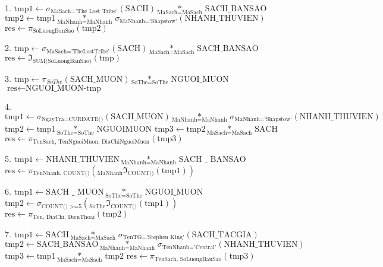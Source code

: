 \documentclass{article}
\begin{document}
1.
$\text{tmp1}\leftarrow {{\sigma }_{\text{MaSach='The Lost Tribe'}}}\left( \text{SACH} \right)\underset{\text{MaSach}=\text{MaSach}}{\mathop{*}}\,\text{SACH_BANSAO}$
$\text{tmp2}\leftarrow \text{tmp1}\underset{\text{MaNhanh}=\text{MaNhanh}}{\mathop{*}}\,{{\sigma }_{\text{MaNhanh='Shapstow'}}}\left( \text{NHANH_THUVIEN} \right)$
$\text{res}\leftarrow {{\pi }_{\text{SoLuongBanSao}}}\left( \text{tmp2} \right)$

2.
$\text{tmp}\leftarrow {{\sigma }_{\text{MaSach='TheLostTribe'}}}\left( \text{SACH} \right)\underset{\text{MaSach}=\text{MaSach}}{\mathop{*}}\,\text{SACH_BANSAO}$
$\text{res}\leftarrow {{\Im }_{\text{SUM(SoLuongBanSao)}}}\left( \text{tmp} \right)$

3.
$\text{tmp}\leftarrow {{\pi }_{SoThe}}\left( \text{SACH_MUON} \right)\underset{\text{SoThe}=\text{SoThe}}{\mathop{*}}\,\text{NGUOI_MUON}$
$\text{res}\leftarrow \text{NGUOI_MUON-tmp}$

4.
$\text{tmp1}\leftarrow {{\sigma }_{\text{NgayTra=CURDATE()}}}\left( \text{SACH_MUON} \right)\underset{\text{MaNhanh}=\text{MaNhanh}}{\mathop{*}}\,{{\sigma }_{\text{MaNhanh='Shapstow'}}}\left( \text{NHANH_THUVIEN} \right)$
$\text{tmp2}\leftarrow \text{tmp1}\underset{\text{SoThe}=\text{SoThe}}{\mathop{*}}\,\text{NGUOIMUON}$
$\text{tmp3}\leftarrow \text{tmp2}\underset{\text{MaSach}=\text{MaSach}}{\mathop{*}}\,\text{SACH}$
$\text{res}\leftarrow {{\pi }_{\text{TenSach, TenNguoiMuon, DiaChiNguoiMuon}}}\left( \text{tmp3} \right)$

5.
$\text{tmp1}\leftarrow \text{NHANH_THUVIEN}\underset{\text{MaNhanh}=\text{MaNhanh}}{\mathop{*}}\,\text{SACH _ BANSAO}$
$\text{res}\leftarrow {{\pi }_{\text{TenNhanh, COUNT()}}}\left( {}_{\text{MaNhanh}}{{\Im }_{\text{COUNT()}}}\left( \text{tmp1} \right) \right)$

6.
$\text{tmp1}\leftarrow \text{SACH _ MUON}\underset{\text{SoThe}=\text{SoThe}}{\mathop{*}}\,\text{NGUOI_MUON}$
$\text{tmp2}\leftarrow {{\sigma }_{\text{COUNT() >=5}}}\left( {}_{\text{SoThe}}{{\Im }_{\text{COUNT()}}}\left( \text{tmp1} \right) \right)$
$\text{res}\leftarrow {{\pi }_{\text{Ten, DiaChi, DienThoai}}}\left( \text{tmp2} \right)$

7.
$\text{tmp1}\leftarrow \text{SACH}\underset{\text{MaSach=MaSach}}{\mathop{\text{*}}}\,{{\sigma }_{\text{TenTG='Stephen King'}}}\left( \text{SACH_TACGIA} \right)$$\text{tmp2}\leftarrow \text{SACH_BANSAO}\underset{\text{MaNhanh=MaNhanh}}{\mathop{\text{*}}}\,{{\sigma }_{\text{TenNhanh='Central'}}}\left( \text{NHANH_THUVIEN} \right)$$\text{tmp3}\leftarrow \text{tmp1}\underset{\text{MaSach=MaSach}}{\mathop{\text{*}}}\,\text{tmp2}$
$\text{res}\leftarrow {{\pi }_{\text{TenSach, SoLuongBanSao}}}\left( \text{tmp3} \right)$
\end{document}
